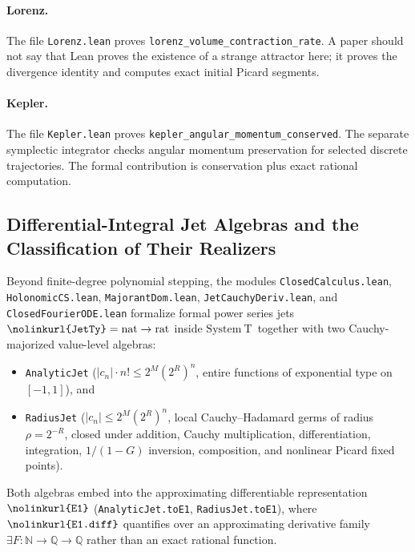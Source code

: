 \documentclass[11pt,a4paper]{article}
\theoremstyle{definition}
\theoremstyle{remark}
\newcommand{\SystemT}{\ensuremath{\mathrm{System\ T}}}
\newcommand{\N}{\ensuremath{\mathbb{N}}}
\newcommand{\Q}{\ensuremath{\mathbb{Q}}}
\newcommand{\lean}[1]{\texttt{\nolinkurl{#1}}}
\begin{document}
\paragraph{Lorenz.}
The file \lean{Lorenz.lean} proves \lean{lorenz_volume_contraction_rate}.  A
paper should not say that Lean proves the existence of a strange attractor
here; it proves the divergence identity and computes exact initial Picard
segments.

\paragraph{Kepler.}
The file \lean{Kepler.lean} proves \lean{kepler_angular_momentum_conserved}.
The separate symplectic integrator checks angular momentum preservation for
selected discrete trajectories.  The formal contribution is conservation plus
exact rational computation.

\subsection{Differential-Integral Jet Algebras and the Classification of Their Realizers}

Beyond finite-degree polynomial stepping, the modules \lean{ClosedCalculus.lean},
\lean{HolonomicCS.lean}, \lean{MajorantDom.lean}, \lean{JetCauchyDeriv.lean},
and \lean{ClosedFourierODE.lean} formalize formal power series jets
\(\lean{JetTy} = \mathrm{nat}\to\mathrm{rat}\) inside \SystemT\ together with
two Cauchy-majorized value-level algebras:
\begin{itemize}
\item \lean{AnalyticJet} (\(|c_n|\cdot n! \le 2^M(2^R)^n\), entire functions of
exponential type on \([-1,1]\)), and
\item \lean{RadiusJet} (\(|c_n| \le 2^M(2^R)^n\), local Cauchy--Hadamard germs of
radius \(\rho = 2^{-R}\), closed under addition, Cauchy multiplication,
differentiation, integration, \(1/(1-G)\) inversion, composition, and nonlinear
Picard fixed points).
\end{itemize}
Both algebras embed into the approximating differentiable representation
\(\lean{E1}\) (\lean{AnalyticJet.toE1}, \lean{RadiusJet.toE1}), where
\(\lean{E1.diff}\) quantifies over an approximating derivative family
\(\exists F : \N\to\Q\to\Q\) rather than an exact rational function.
\end{document}
